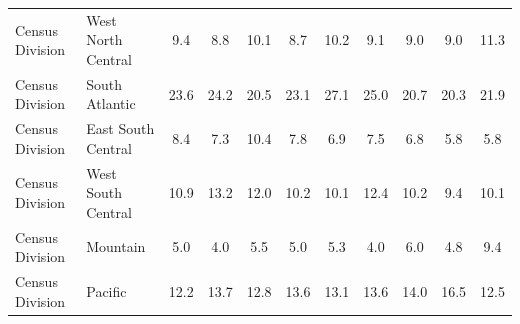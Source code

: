 \begin{tabular}{llccc|ccc|ccc}
Census Division&West North Central&9.4&8.8&10.1&8.7&10.2&9.1&9.0&9.0&11.3\\
Census Division&South Atlantic&23.6&24.2&20.5&23.1&27.1&25.0&20.7&20.3&21.9\\
Census Division&East South Central&8.4&7.3&10.4&7.8&6.9&7.5&6.8&5.8&5.8\\
Census Division&West South Central&10.9&13.2&12.0&10.2&10.1&12.4&10.2&9.4&10.1\\
Census Division&Mountain&5.0&4.0&5.5&5.0&5.3&4.0&6.0&4.8&9.4\\
Census Division&Pacific&12.2&13.7&12.8&13.6&13.1&13.6&14.0&16.5&12.5\\
\hline\hline
\end{tabular}
